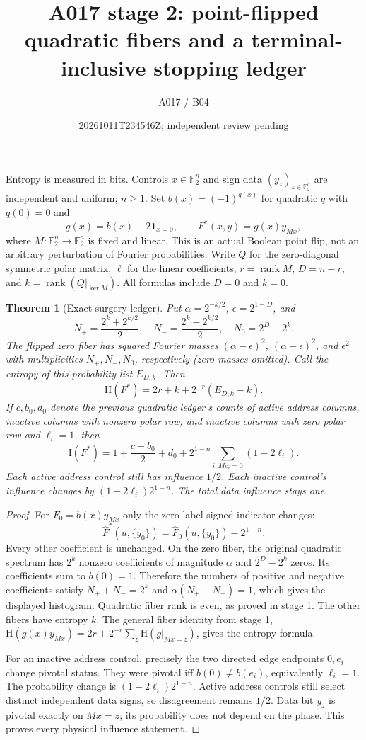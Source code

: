 \documentclass[11pt]{article}
\newtheorem{theorem}{Theorem}
\newcommand{\F}{\mathbb F_2}
\newcommand{\rk}{\operatorname{rank}}
\newcommand{\I}{\mathrm I}
\newcommand{\Ent}{\mathrm H}
\begin{document}
\title{A017 stage 2: point-flipped quadratic fibers and a terminal-inclusive stopping ledger}
\author{A017 / B04}
\date{20261011T234546Z; independent review pending}
\maketitle
Entropy is measured in bits. Controls $x\in\F^n$ and sign data
$(y_z)_{z\in\F^a}$ are independent and uniform; $n\ge1$.
Set $b(x)=(-1)^{q(x)}$ for quadratic $q$ with $q(0)=0$ and
\[
 g(x)=b(x)-2\mathbf1_{x=0},\qquad F^*(x,y)=g(x)y_{Mx},
\]
where $M:\F^n\to\F^a$ is fixed and linear. This is an actual Boolean
point flip, not an arbitrary perturbation of Fourier probabilities.
Write $Q$ for the zero-diagonal symmetric polar matrix, $\ell$ for the
linear coefficients, $r=\rk M$, $D=n-r$, and
$k=\rk(Q|_{\ker M})$. All formulas include $D=0$ and $k=0$.

\begin{theorem}[Exact surgery ledger]
Put $\alpha=2^{-k/2}$, $\epsilon=2^{1-D}$, and
\[
 N_+=\frac{2^k+2^{k/2}}2,\quad N_-=\frac{2^k-2^{k/2}}2,
 \quad N_0=2^D-2^k.
\]
The flipped zero fiber has squared Fourier masses
$(\alpha-\epsilon)^2$, $(\alpha+\epsilon)^2$, and $\epsilon^2$
with multiplicities $N_+,N_-,N_0$, respectively (zero masses omitted).
Call the entropy of this probability list $E_{D,k}$. Then
\[
 \Ent(F^*)=2r+k+2^{-r}(E_{D,k}-k).
\]
If $c,b_0,d_0$ denote the previous quadratic ledger's counts of
active address columns, inactive columns with nonzero polar row,
and inactive columns with zero polar row and $\ell_i=1$, then
\[
 \I(F^*)=1+\frac{c+b_0}{2}+d_0
       +2^{1-n}\sum_{i:Me_i=0}(1-2\ell_i).
\]
Each active address control still has influence $1/2$. Each inactive
control's influence changes by $(1-2\ell_i)2^{1-n}$. The total data
influence stays one.
\end{theorem}
\begin{proof}
For $F_0=b(x)y_{Mx}$ only the zero-label signed indicator changes:
\[
 \widehat F^*(u,\{y_0\})=\widehat F_0(u,\{y_0\})-2^{1-n}.
\]
Every other coefficient is unchanged. On the zero fiber, the original
quadratic spectrum has $2^k$ nonzero coefficients of magnitude
$\alpha$ and $2^D-2^k$ zeros. Its coefficients sum to $b(0)=1$.
Therefore the numbers of positive and negative coefficients satisfy
$N_++N_-=2^k$ and $\alpha(N_+-N_-)=1$, which gives the displayed
histogram. Quadratic fiber rank is even, as proved in stage 1.
The other fibers have entropy $k$. The general fiber identity from
stage 1, $\Ent(g(x)y_{Mx})=2r+2^{-r}\sum_z\Ent(g|_{Mx=z})$,
gives the entropy formula.

For an inactive address control, precisely the two directed edge
endpoints $0,e_i$ change pivotal status. They were pivotal iff
$b(0)\ne b(e_i)$, equivalently $\ell_i=1$. The probability change is
$(1-2\ell_i)2^{1-n}$. Active address controls still select distinct
independent data signs, so disagreement remains $1/2$.
Data bit $y_z$ is pivotal exactly on $Mx=z$; its probability does
not depend on the phase. This proves every physical influence statement.
\end{proof}
\end{document}
